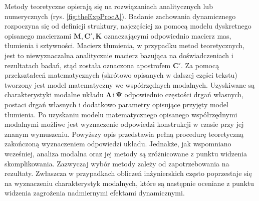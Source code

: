 Metody teoretyczne opierają się na rozwiązaniach analitycznych lub numerycznych (rys. \ref{fig:theExpProcA}). Badanie zachowania dynamicznego rozpoczyna się od definicji struktury, najczęściej za pomocą modelu dyskretnego opisanego macierzami $\mathbf{M}, \mathbf{C}', \mathbf{K}$ oznaczającymi odpowiednio macierz mas, tłumienia i sztywności. Macierz tłumienia, w przypadku metod teoretycznych, jest to niewyznaczalna analitycznie macierz bazująca na doświadczeniach i rezultatach badań, stąd została oznaczona apostrofem $\mathbf{C'}$. Za pomocą przekształceń matematycznych (skrótowo opisanych w dalszej części tekstu) tworzony jest model matematyczny we współrzędnych modalnych. Uzyskiwane są charakterystyki modalne układu $\mathbf{\Lambda} \,\mathrm{i}\, \mathbf{\Psi}$ odpowiednio częstości drgań własnych, postaci drgań własnych i dodatkowo parametry opisujące przyjęty model tłumienia. Po uzyskaniu modelu matematycznego opisanego współrzędnymi modalnymi możliwe jest wyznaczenie odpowiedzi konstrukcji w czasie przy jej znanym wymuszeniu. Powyższy opis przedstawia pełną procedurę teoretyczną zakończoną wyznaczeniem odpowiedzi układu. Jednakże, jak wspomniano wcześniej, analiza modalna oraz jej metody są zróżnicowane z punktu widzenia skomplikowania. Zazwyczaj wybór metody zależy od zapotrzebowania na rezultaty. Zwłaszcza w przypadkach obliczeń inżynierskich często poprzestaje się na wyznaczeniu charakterystyk modalnych, które są następnie oceniane z punktu widzenia zagrożenia nadmiernymi efektami dynamicznymi.
